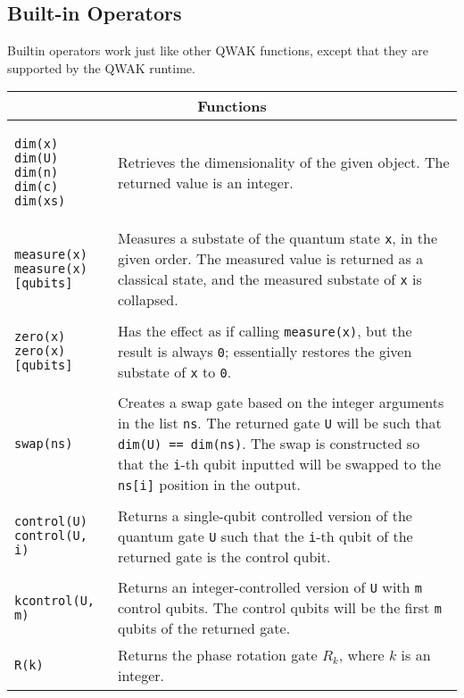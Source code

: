 \documentclass{article}
\begin{document}
\subsection{Built-in Operators}

Builtin operators work just like other QWAK functions, except that they are supported by the QWAK runtime.

\begin{center}
\begin{tabular}{| l | m{8cm} |}
\hline
\multicolumn{2}{|c|}{\textbf{Functions}} \\ \hline
\begin{lstlisting}
dim(x)
dim(U)
dim(n)
dim(c)
dim(xs)
\end{lstlisting} & 
Retrieves the dimensionality of the given object. The returned value is an integer. \\ \hline
\begin{lstlisting}
measure(x)
measure(x)[qubits]
\end{lstlisting} & 
Measures a substate of the quantum state \lstinline$x$, in the given order. The measured value is returned as a classical state, and the measured substate of \lstinline$x$ is collapsed. \\ \hline
\begin{lstlisting}
zero(x)
zero(x)[qubits]
\end{lstlisting} & 
Has the effect as if calling \lstinline$measure(x)$, but the result is always \lstinline$0$; essentially restores the given substate of \lstinline$x$ to \lstinline$0$. \\ \hline
\begin{lstlisting}
swap(ns)
\end{lstlisting} & 
Creates a swap gate based on the integer arguments in the list \lstinline$ns$. The returned gate \lstinline$U$ will be such that \lstinline$dim(U) == dim(ns)$. The swap is constructed so that the \lstinline$i$-th qubit inputted will be swapped to the \lstinline$ns[i]$ position in the output. \\ \hline
\begin{lstlisting}
control(U)
control(U, i)
\end{lstlisting} & 
Returns a single-qubit controlled version of the quantum gate \lstinline$U$ such that the \lstinline$i$-th qubit of the returned gate is the control qubit. \\ \hline
\begin{lstlisting}
kcontrol(U, m)
\end{lstlisting} & 
Returns an integer-controlled version of \lstinline$U$ with \lstinline$m$ control qubits. The control qubits will be the first \lstinline$m$ qubits of the returned gate. \\ \hline
\begin{lstlisting}
R(k)
\end{lstlisting} & 
Returns the phase rotation gate $R_k$, where $k$ is an integer. \\ \hline
\end{tabular}
\end{center}
\end{document}
